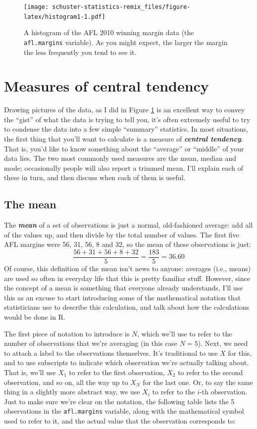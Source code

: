 \documentclass[
]{book}
\begin{document}
\begin{figure}
\centering
\texttt{[image: schuster-statistics-remix\_files/figure-latex/histogram1-1.pdf]}
\caption{\label{fig:histogram1}A histogram of the AFL 2010 winning margin data (the \texttt{afl.margins} variable). As you might expect, the larger the margin the less frequently you tend to see it.}
\end{figure}

\hypertarget{centraltendency}{%
\section{Measures of central tendency}\label{centraltendency}}

Drawing pictures of the data, as I did in Figure \ref{fig:histogram1} is an excellent way to convey the ``gist'' of what the data is trying to tell you, it's often extremely useful to try to condense the data into a few simple ``summary'' statistics. In most situations, the first thing that you'll want to calculate is a measure of \textbf{\emph{central tendency}}. That is, you'd like to know something about the ``average'' or ``middle'' of your data lies. The two most commonly used measures are the mean, median and mode; occasionally people will also report a trimmed mean. I'll explain each of these in turn, and then discuss when each of them is useful.

\hypertarget{mean}{%
\subsection{The mean}\label{mean}}

The \textbf{\emph{mean}} of a set of observations is just a normal, old-fashioned average: add all of the values up, and then divide by the total number of values. The first five AFL margins were 56, 31, 56, 8 and 32, so the mean of these observations is just:
\[
\frac{56 + 31 + 56 + 8 + 32}{5} = \frac{183}{5} = 36.60
\]
Of course, this definition of the mean isn't news to anyone: averages (i.e., means) are used so often in everyday life that this is pretty familiar stuff. However, since the concept of a mean is something that everyone already understands, I'll use this as an excuse to start introducing some of the mathematical notation that statisticians use to describe this calculation, and talk about how the calculations would be done in R.

The first piece of notation to introduce is \(N\), which we'll use to refer to the number of observations that we're averaging (in this case \(N = 5\)). Next, we need to attach a label to the observations themselves. It's traditional to use \(X\) for this, and to use subscripts to indicate which observation we're actually talking about. That is, we'll use \(X_1\) to refer to the first observation, \(X_2\) to refer to the second observation, and so on, all the way up to \(X_N\) for the last one. Or, to say the same thing in a slightly more abstract way, we use \(X_i\) to refer to the \(i\)-th observation. Just to make sure we're clear on the notation, the following table lists the 5 observations in the \texttt{afl.margins} variable, along with the mathematical symbol used to refer to it, and the actual value that the observation corresponds to:
\end{document}
